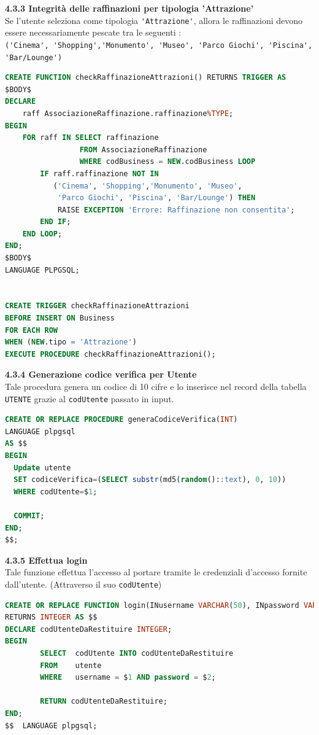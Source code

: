 \documentclass[a4paper,12pt]{article}
\begin{document}
{\flushleft \bf 4.3.3 Integrità delle raffinazioni per tipologia 'Attrazione'}\\
\normalsize{Se l'utente seleziona come tipologia \verb|'Attrazione'|, allora le raffinazioni
devono essere necessariamente pescate tra le seguenti : \\
\verb|('Cinema', 'Shopping','Monumento', 'Museo', 'Parco Giochi', 'Piscina',|\\
\verb|'Bar/Lounge')|}
\begin{lstlisting}[language=SQL]
CREATE FUNCTION checkRaffinazioneAttrazioni() RETURNS TRIGGER AS
$BODY$
DECLARE
	raff AssociazioneRaffinazione.raffinazione%TYPE;
BEGIN
	FOR raff IN SELECT raffinazione 
			     FROM AssociazioneRaffinazione 
			     WHERE codBusiness = NEW.codBusiness LOOP
		IF raff.raffinazione NOT IN 
		   ('Cinema', 'Shopping','Monumento', 'Museo', 
		    'Parco Giochi', 'Piscina', 'Bar/Lounge') THEN
			RAISE EXCEPTION 'Errore: Raffinazione non consentita';
		END IF;
	END LOOP;
END;
$BODY$
LANGUAGE PLPGSQL;


CREATE TRIGGER checkRaffinazioneAttrazioni
BEFORE INSERT ON Business
FOR EACH ROW
WHEN (NEW.tipo = 'Attrazione')
EXECUTE PROCEDURE checkRaffinazioneAttrazioni();
\end{lstlisting}
\newpage

\newpage\null{}\setcounter{page}{18}
\vspace{-2cm}
{\flushleft \bf 4.3.4  Generazione codice verifica per Utente}\\
Tale procedura genera un codice di 10 cifre e lo inserisce nel record della tabella
\verb|UTENTE| grazie al \verb|codUtente| passato in input.
\begin{lstlisting}[language=SQL]
CREATE OR REPLACE PROCEDURE generaCodiceVerifica(INT)
LANGUAGE plpgsql
AS $$
BEGIN
  Update utente
  SET codiceVerifica=(SELECT substr(md5(random()::text), 0, 10))
  WHERE codUtente=$1;

  COMMIT;
END;
$$;
\end{lstlisting}

\vspace*{+1cm}

{\flushleft \bf 4.3.5  Effettua login}\\
Tale funzione effettua l'accesso al portare tramite le credenziali d'accesso fornite
dall'utente. (Attraverso il suo \verb|codUtente|)
\begin{lstlisting}[language=SQL]
CREATE OR REPLACE FUNCTION login(INusername VARCHAR(50), INpassword VARCHAR(100))
RETURNS INTEGER AS $$
DECLARE codUtenteDaRestituire INTEGER;
BEGIN
        SELECT  codUtente INTO codUtenteDaRestituire
        FROM    utente
        WHERE   username = $1 AND password = $2;

        RETURN codUtenteDaRestituire;
END;
$$  LANGUAGE plpgsql;
\end{lstlisting}
\end{document}
